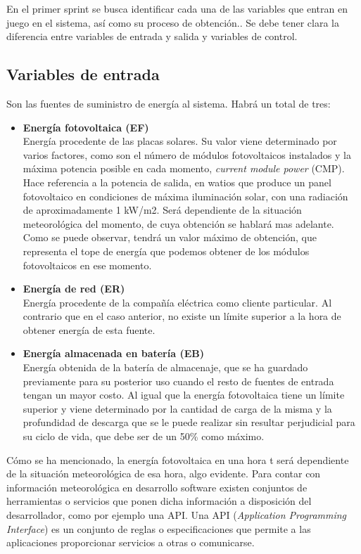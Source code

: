 En el primer sprint se busca identificar cada una de las variables que entran en juego en el sistema, así como su proceso de obtención.. Se debe tener clara la diferencia entre variables de entrada y salida y variables de control.
\subsection{Variables de entrada}
Son las fuentes de suministro de energía al sistema. Habrá un total de tres:
\begin{itemize}
	\item \textbf{Energía fotovoltaica (EF)}\\ Energía procedente de las placas solares. Su valor viene determinado por varios factores, como son el número de módulos fotovoltaicos instalados y la máxima potencia posible en cada momento, \textit{current module power} (CMP). Hace referencia a la potencia de salida, en watios que produce un panel fotovoltaico en condiciones de máxima iluminación solar, con una radiación de aproximadamente 1 kW/m2. Será dependiente de la situación meteorológica del momento, de cuya obtención se hablará mas adelante. Como se puede observar, tendrá un valor máximo de obtención, que representa el tope de energía que podemos obtener de los módulos fotovoltaicos en ese momento.
	\item \textbf{Energía de red (ER)}\\ Energía procedente de la compañía eléctrica como cliente particular. Al contrario que en el caso anterior, no existe un límite superior a la hora de obtener energía de esta fuente.
	\item \textbf{Energía almacenada en batería (EB)}\\ Energía obtenida de la batería de almacenaje, que se ha guardado previamente para su posterior uso cuando el resto de fuentes de entrada tengan un mayor costo. Al igual que la energía fotovoltaica tiene un límite superior y viene determinado por la cantidad de carga de la misma y la profundidad de descarga que se le puede realizar sin resultar perjudicial para su ciclo de vida, que debe ser de un 50\% como máximo.
\end{itemize}

Cómo se ha mencionado, la energía fotovoltaica en una hora t será dependiente de la situación meteorológica de esa hora, algo evidente. Para contar con información meteorológica en desarrollo software existen conjuntos de herramientas o servicios que ponen dicha información a disposición del desarrollador, como por ejemplo una API. Una API (\textit{Application Programming Interface}) es un conjunto de reglas o especificaciones que permite a las aplicaciones proporcionar servicios a otras o comunicarse.\\


